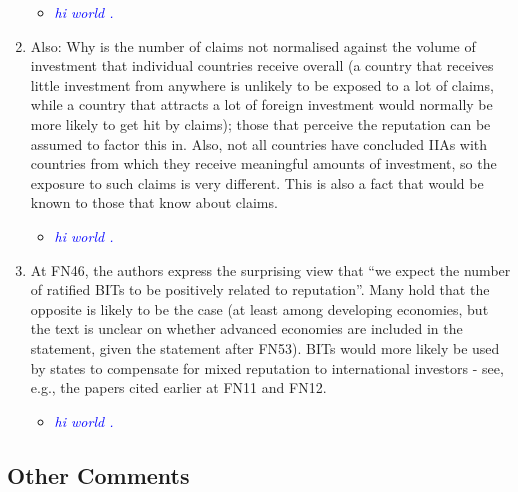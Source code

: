 \begin{enumerate}
	\begin{itemize}
		\item \textcolor{blue}{ \emph{ hi world . }}
	\end{itemize}
	\item Also: Why is the number of claims not normalised against the volume of investment that individual countries receive overall (a country that receives little investment from anywhere is unlikely to be exposed to a lot of claims, while a country that attracts a lot of foreign investment would normally be more likely to get hit by claims); those that perceive the reputation can be assumed to factor this in. Also, not all countries have concluded IIAs with countries from which they receive meaningful amounts of investment, so the exposure to such claims is very different. This is also a fact that would be known to those that know about claims. 
	\begin{itemize}
		\item \textcolor{blue}{ \emph{ hi world . }}
	\end{itemize}
	\item At FN46, the authors express the surprising view that ``we expect the number of ratified BITs to be positively related to reputation''. Many hold that the opposite is likely to be the case (at least among developing economies, but the text is unclear on whether advanced economies are included in the statement, given the statement after FN53). BITs would more likely be used by states to compensate for mixed reputation to international investors - see, e.g., the papers cited earlier at FN11 and FN12. 
	\begin{itemize}
		\item \textcolor{blue}{ \emph{ hi world . }}
	\end{itemize}
\end{enumerate}

\subsection*{Other Comments}

